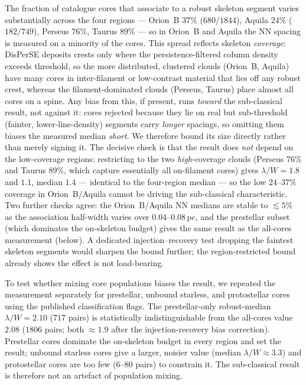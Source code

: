 \documentclass[usenatbib,twoside,twocolumn]{mnras}
\begin{document}
The fraction of catalogue cores that associate to a robust skeleton segment varies substantially across the four regions --- Orion~B $37\%$ ($680/1844$), Aquila $24\%$ ($182/749$), Perseus $76\%$, Taurus $89\%$ --- so in Orion~B and Aquila the NN spacing is measured on a minority of the cores. This spread reflects skeleton \emph{coverage}: DisPerSE deposits crests only where the persistence-filtered column density exceeds threshold, so the more distributed, clustered clouds (Orion~B, Aquila) have many cores in inter-filament or low-contrast material that lies off any robust crest, whereas the filament-dominated clouds (Perseus, Taurus) place almost all cores on a spine. Any bias from this, if present, runs \emph{toward} the sub-classical result, not against it: cores rejected because they lie on real but sub-threshold (fainter, lower-line-density) segments carry \emph{longer} spacings, so omitting them biases the measured median \emph{short}. We therefore bound its size directly rather than merely signing it. The decisive check is that the result does \emph{not} depend on the low-coverage regions: restricting to the two \emph{high}-coverage clouds (Perseus $76\%$ and Taurus $89\%$, which capture essentially all on-filament cores) gives $\lambda/W=1.8$ and $1.1$, median $1.4$ --- identical to the four-region median --- so the low $24$--$37\%$ coverage in Orion~B/Aquila cannot be driving the sub-classical characteristic. Two further checks agree: the Orion~B/Aquila NN medians are stable to $\lesssim5\%$ as the association half-width varies over $0.04$--$0.08$\,pc, and the prestellar subset (which dominates the on-skeleton budget) gives the same result as the all-cores measurement (below). A dedicated injection--recovery test dropping the faintest skeleton segments would sharpen the bound further; the region-restricted bound already shows the effect is not load-bearing.

To test whether mixing core populations biases the result, we repeated the measurement separately for prestellar, unbound starless, and protostellar cores using the published classification flags. The prestellar-only robust-median $\lambda/W=2.10$ ($717$ pairs) is statistically indistinguishable from the all-cores value $2.08$ ($1806$ pairs; both $\approx1.9$ after the injection-recovery bias correction). Prestellar cores dominate the on-skeleton budget in every region and set the result; unbound starless cores give a larger, noisier value (median $\lambda/W\approx3.3$) and protostellar cores are too few ($6$--$80$ pairs) to constrain it. The sub-classical result is therefore not an artefact of population mixing.
\end{document}
